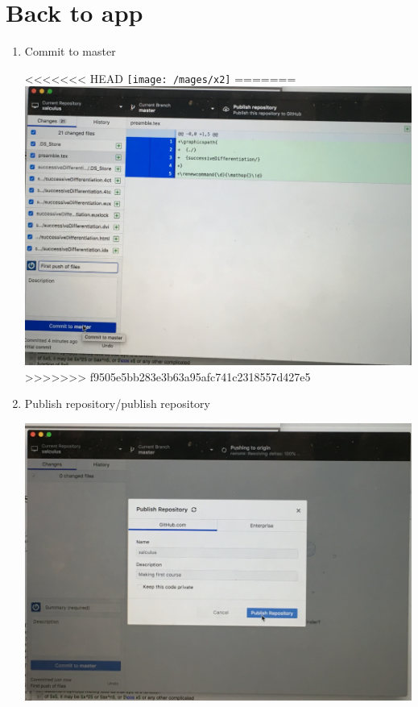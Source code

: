 \documentclass{ximera}
\begin{document}
\section{Back to app}
\begin{enumerate}
\item Commit to master
\begin{center}
<<<<<<< HEAD
\texttt{[image: /mages/x2]}
=======
\includegraphics[scale=.09]{images/x2}
>>>>>>> f9505e5bb283e3b63a95afc741c2318557d427e5
\end{center}
\item Publish repository/publish repository   
\begin{center}
\includegraphics[scale=.09]{images/x3}
\end{center}
\end{enumerate}
\end{document}
